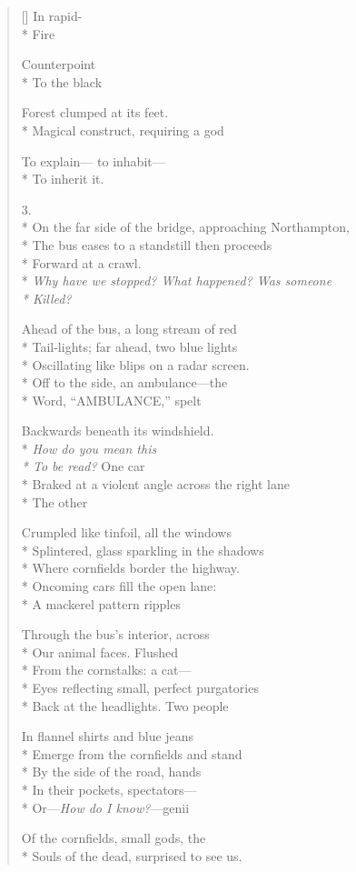 \begin{verse}[\versewidth]
In rapid-\\*
Fire 

Counterpoint\\*
To the black

Forest clumped at its feet.\\*
Magical construct, requiring a god

To explain---     to inhabit--- \\*
To inherit it.

3.\\*
On the far side of the bridge, approaching Northampton,\\*
The bus eases to a standstill    then proceeds\\*
Forward at a crawl.\\*
\textit{Why have we stopped?   What happened?   Was someone\\*
Killed?}

Ahead of the bus, a long stream of red\\*
Tail-lights; far ahead, two blue lights\\*
Oscillating like blips on a radar screen.\\*
Off to the side, an ambulance---the \\*
Word, ``AMBULANCE,'' spelt

Backwards beneath its windshield.\\*
\textit{How do you mean this \\*
To be read?} \qquad One car\\*
Braked at a violent angle across the right lane\\*
The other

Crumpled like tinfoil, all the windows\\*
Splintered, glass sparkling in the shadows\\*
Where cornfields border the highway.\\*
Oncoming cars fill the open lane: \\*
A mackerel pattern ripples 

Through the bus's interior, across\\*
Our animal faces.     Flushed\\*
From the cornstalks: a cat---\\*
Eyes reflecting small, perfect purgatories\\*
Back at the headlights.  Two people

In flannel shirts and blue jeans\\*
Emerge from the cornfields and stand\\*
By the side of the road, hands\\*
In their pockets, spectators---\\*
Or---\textit{How do I know?}---genii 

Of the cornfields, small gods, the\\*
Souls of the dead, surprised to see us.
\end{verse}
